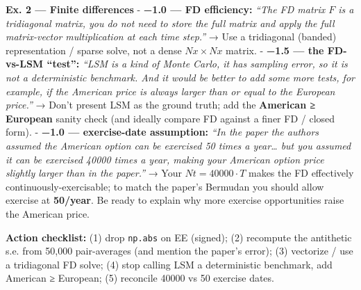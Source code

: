 \documentclass[
  11pt,
]{article}
\begin{document}
\textbf{Ex. 2 --- Finite differences} - \textbf{−1.0 --- FD efficiency:}
\emph{``The FD matrix \(F\) is a tridiagonal matrix, you do not need to
store the full matrix and apply the full matrix-vector multiplication at
each time step.''} → Use a tridiagonal (banded) representation / sparse
solve, not a dense \(Nx×Nx\) matrix. - \textbf{−1.5 --- the FD-vs-LSM
``test'':} \emph{``LSM is a kind of Monte Carlo, it has sampling error,
so it is not a deterministic benchmark. And it would be better to add
some more tests, for example, if the American price is always larger
than or equal to the European price.''} → Don't present LSM as the
ground truth; add the \textbf{American ≥ European} sanity check (and
ideally compare FD against a finer FD / closed form). - \textbf{−1.0 ---
exercise-date assumption:} \emph{``In the paper the authors assumed the
American option can be exercised 50 times a year\ldots{} but you assumed
it can be exercised 40000 times a year, making your American option
price slightly larger than in the paper.''} → Your \(Nt = 40000·T\)
makes the FD effectively continuously-exercisable; to match the paper's
Bermudan you should allow exercise at \textbf{50/year}. Be ready to
explain why more exercise opportunities raise the American price.

\textbf{Action checklist:} (1) drop \texttt{np.abs} on EE (signed); (2)
recompute the antithetic s.e. from 50,000 pair-averages (and mention the
paper's error); (3) vectorize / use a tridiagonal FD solve; (4) stop
calling LSM a deterministic benchmark, add American ≥ European; (5)
reconcile 40000 vs 50 exercise dates.
\end{document}
